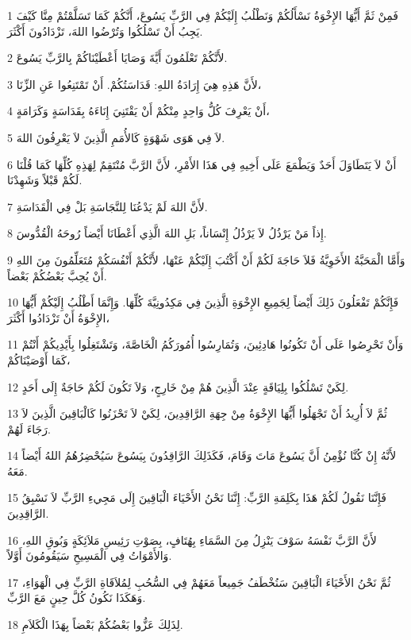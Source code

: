 \par 1 فَمِنْ ثَمَّ أَيُّهَا الإِخْوَةُ نَسْأَلُكُمْ وَنَطْلُبُ إِلَيْكُمْ فِي الرَّبِّ يَسُوعَ، أَنَّكُمْ كَمَا تَسَلَّمْتُمْ مِنَّا كَيْفَ يَجِبُ أَنْ تَسْلُكُوا وَتُرْضُوا اللهَ، تَزْدَادُونَ أَكْثَرَ.
\par 2 لأَنَّكُمْ تَعْلَمُونَ أَيَّةَ وَصَايَا أَعْطَيْنَاكُمْ بِالرَّبِّ يَسُوعَ.
\par 3 لأَنَّ هَذِهِ هِيَ إِرَادَةُ اللهِ: قَدَاسَتُكُمْ. أَنْ تَمْتَنِعُوا عَنِ الزِّنَا،
\par 4 أَنْ يَعْرِفَ كُلُّ وَاحِدٍ مِنْكُمْ أَنْ يَقْتَنِيَ إِنَاءَهُ بِقَدَاسَةٍ وَكَرَامَةٍ،
\par 5 لاَ فِي هَوَى شَهْوَةٍ كَالأُمَمِ الَّذِينَ لاَ يَعْرِفُونَ اللهَ.
\par 6 أَنْ لاَ يَتَطَاوَلَ أَحَدٌ وَيَطْمَعَ عَلَى أَخِيهِ فِي هَذَا الأَمْرِ، لأَنَّ الرَّبَّ مُنْتَقِمٌ لِهَذِهِ كُلِّهَا كَمَا قُلْنَا لَكُمْ قَبْلاً وَشَهِدْنَا.
\par 7 لأَنَّ اللهَ لَمْ يَدْعُنَا لِلنَّجَاسَةِ بَلْ فِي الْقَدَاسَةِ.
\par 8 إِذاً مَنْ يَرْذُلُ لاَ يَرْذُلُ إِنْسَاناً، بَلِ اللهَ الَّذِي أَعْطَانَا أَيْضاً رُوحَهُ الْقُدُّوسَ.
\par 9 وَأَمَّا الْمَحَبَّةُ الأَخَوِيَّةُ فَلاَ حَاجَةَ لَكُمْ أَنْ أَكْتُبَ إِلَيْكُمْ عَنْهَا، لأَنَّكُمْ أَنْفُسَكُمْ مُتَعَلِّمُونَ مِنَ اللهِ أَنْ يُحِبَّ بَعْضُكُمْ بَعْضاً.
\par 10 فَإِنَّكُمْ تَفْعَلُونَ ذَلِكَ أَيْضاً لِجَمِيعِ الإِخْوَةِ الَّذِينَ فِي مَكِدُونِيَّةَ كُلِّهَا. وَإِنَّمَا أَطْلُبُ إِلَيْكُمْ أَيُّهَا الإِخْوَةُ أَنْ تَزْدَادُوا أَكْثَرَ،
\par 11 وَأَنْ تَحْرِصُوا عَلَى أَنْ تَكُونُوا هَادِئِينَ، وَتُمَارِسُوا أُمُورَكُمُ الْخَاصَّةَ، وَتَشْتَغِلُوا بِأَيْدِيكُمْ أَنْتُمْ كَمَا أَوْصَيْنَاكُمْ،
\par 12 لِكَيْ تَسْلُكُوا بِلِيَاقَةٍ عِنْدَ الَّذِينَ هُمْ مِنْ خَارِجٍ، وَلاَ تَكُونَ لَكُمْ حَاجَةٌ إِلَى أَحَدٍ.
\par 13 ثُمَّ لاَ أُرِيدُ أَنْ تَجْهَلُوا أَيُّهَا الإِخْوَةُ مِنْ جِهَةِ الرَّاقِدِينَ، لِكَيْ لاَ تَحْزَنُوا كَالْبَاقِينَ الَّذِينَ لاَ رَجَاءَ لَهُمْ.
\par 14 لأَنَّهُ إِنْ كُنَّا نُؤْمِنُ أَنَّ يَسُوعَ مَاتَ وَقَامَ، فَكَذَلِكَ الرَّاقِدُونَ بِيَسُوعَ سَيُحْضِرُهُمُ اللهُ أَيْضاً مَعَهُ.
\par 15 فَإِنَّنَا نَقُولُ لَكُمْ هَذَا بِكَلِمَةِ الرَّبِّ: إِنَّنَا نَحْنُ الأَحْيَاءَ الْبَاقِينَ إِلَى مَجِيءِ الرَّبِّ لاَ نَسْبِقُ الرَّاقِدِينَ.
\par 16 لأَنَّ الرَّبَّ نَفْسَهُ سَوْفَ يَنْزِلُ مِنَ السَّمَاءِ بِهُتَافٍ، بِصَوْتِ رَئِيسِ مَلاَئِكَةٍ وَبُوقِ اللهِ، وَالأَمْوَاتُ فِي الْمَسِيحِ سَيَقُومُونَ أَوَّلاً.
\par 17 ثُمَّ نَحْنُ الأَحْيَاءَ الْبَاقِينَ سَنُخْطَفُ جَمِيعاً مَعَهُمْ فِي السُّحُبِ لِمُلاَقَاةِ الرَّبِّ فِي الْهَوَاءِ، وَهَكَذَا نَكُونُ كُلَّ حِينٍ مَعَ الرَّبِّ.
\par 18 لِذَلِكَ عَزُّوا بَعْضُكُمْ بَعْضاً بِهَذَا الْكَلاَمِ.


